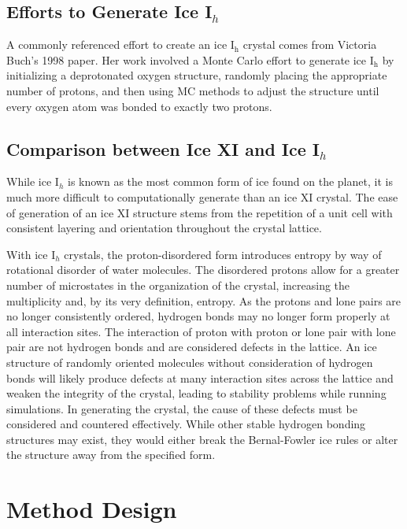 \subsection{Efforts to Generate Ice I$_{h}$}


A commonly referenced effort to create an ice I$_{\mathrm{h}}$ crystal comes from Victoria Buch's 1998 paper. \cite{MCIce}
Her work involved a Monte Carlo effort to generate ice I$_{\mathrm{h}}$ by initializing a deprotonated oxygen structure, randomly placing the appropriate number of protons, and then using MC methods to adjust the structure until every oxygen atom was bonded to exactly two protons.


\subsection{Comparison between Ice XI and Ice I$_{h}$}

While ice I$_{h}$ is known as the most common form of ice found on the planet, it is much more difficult to computationally generate than an ice XI crystal. 
The ease of generation of an ice XI structure stems from the repetition of a unit cell with consistent layering and orientation throughout the crystal lattice. 


With ice I$_{h}$ crystals, the proton-disordered form introduces entropy by way of rotational disorder of water molecules. 
The disordered protons allow for a greater number of microstates in the organization of the crystal, increasing the multiplicity and, by its very definition, entropy.
As the protons and lone pairs are no longer consistently ordered, hydrogen bonds may no longer form properly at all interaction sites. 
The interaction of proton with proton or lone pair with lone pair are not hydrogen bonds and are considered defects in the lattice. 
An ice structure of randomly oriented molecules without consideration of hydrogen bonds will likely produce defects at many interaction sites across the lattice and weaken the integrity of the crystal, leading to stability problems while running simulations. 
In generating the crystal, the cause of these defects must be considered and countered effectively.
While other stable hydrogen bonding structures may exist, they would either break the Bernal-Fowler ice rules or alter the structure away from the specified form.



\section{Method Design}

